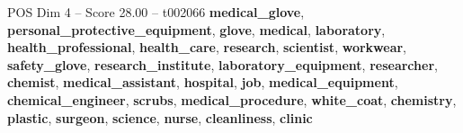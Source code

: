 \begin{textsample}{POS Dim 4 – Score 28.00 – t002066}  \label{ex:f4_pos_027}
\textbf{medical\_glove}, \textbf{personal\_protective\_equipment}, \textbf{glove}, \textbf{medical}, \textbf{laboratory}, \textbf{health\_professional}, \textbf{health\_care}, \textbf{research}, \textbf{scientist}, \textbf{workwear}, \textbf{safety\_glove}, \textbf{research\_institute}, \textbf{laboratory\_equipment}, \textbf{researcher}, \textbf{chemist}, \textbf{medical\_assistant}, \textbf{hospital}, \textbf{job}, \textbf{medical\_equipment}, \textbf{chemical\_engineer}, \textbf{scrubs}, \textbf{medical\_procedure}, \textbf{white\_coat}, \textbf{chemistry}, \textbf{plastic}, \textbf{surgeon}, \textbf{science}, \textbf{nurse}, \textbf{cleanliness}, \textbf{clinic}

\end{textsample}
